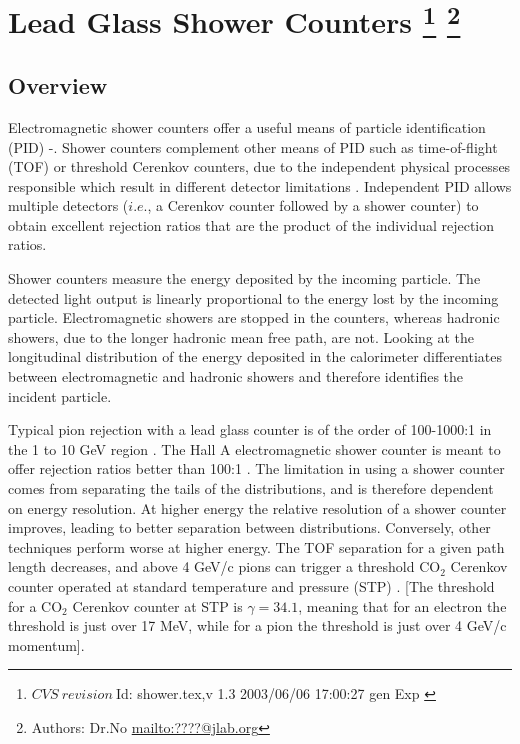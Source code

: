 \section[Lead Glass Shower Counters]{Lead Glass Shower Counters
\footnote{
  $CVS~revision~ $Id: shower.tex,v 1.3 2003/06/06 17:00:27 gen Exp $ $
}
\footnote{Authors: Dr.No \url{mailto:????@jlab.org}}
}
  

\subsection{Overview}

Electromagnetic shower counters offer a useful means of particle
identification (PID) \cite{bartozek}-\cite{appel}. Shower counters
complement other means of PID such as time-of-flight (TOF) or
threshold Cerenkov counters, due to the independent physical processes
responsible which result in different detector
limitations \cite{goldberg}. Independent PID allows multiple detectors
($i.e.$, a Cerenkov counter followed by a shower counter) to obtain
excellent rejection ratios that are the product of the individual
rejection ratios.

Shower counters measure the energy deposited by the incoming particle.  
The detected light output is linearly proportional to the energy lost
by the incoming particle.  Electromagnetic showers are stopped in the 
counters, whereas hadronic showers, due to the longer hadronic mean free 
path, are not.  Looking at the longitudinal distribution of the energy 
deposited in the calorimeter differentiates between electromagnetic and 
hadronic showers and therefore identifies the incident particle.

Typical pion rejection with a lead glass counter is of the order of 
100-1000:1 in the 1 to 10 GeV region \cite{ferbel}.
The Hall A electromagnetic shower counter is meant to offer rejection 
ratios better than 100:1 \cite{CDR}.  
The limitation in using a shower counter comes from separating the tails
of the distributions, and is therefore dependent on energy resolution.
At higher energy the relative resolution of a shower counter improves, leading
to better separation between distributions.  Conversely, other techniques
perform worse at higher energy.  
The TOF separation for a given path length decreases, and above 4 GeV/c pions
can trigger a threshold CO$_2$ Cerenkov counter operated at standard 
temperature and pressure (STP) \cite{ferbel}. 
[The threshold for a CO$_2$ Cerenkov counter at STP is $\gamma=34.1$, meaning 
that for an electron the threshold is just over 17 MeV, while for a pion the
threshold is just over 4 GeV/c momentum].

